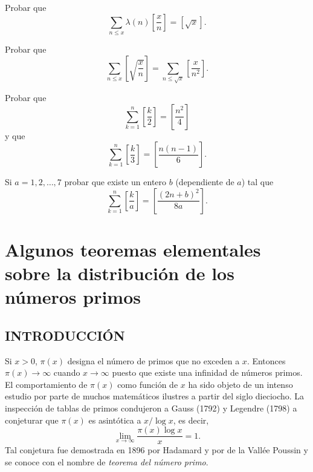 \documentclass[12pt,a4paper]{book}
\begin{document}
    \begin{ejercicio}
        Probar que
        \begin{equation*}
            \sum_{n\leq x}\lambda(n)\left[\frac{x}{n}\right]=[\sqrt x].
        \end{equation*}
    \end{ejercicio}

    \begin{ejercicio}
        Probar que
        \begin{equation*}
            \sum_{n\leq x}\left[\sqrt{\frac{x}{n}}\right]=\sum_{n\leq\sqrt x}\left[\frac{x}{n^2}\right].
        \end{equation*}
    \end{ejercicio}

    \begin{ejercicio}
        Probar que
        \begin{equation*}
            \sum_{k=1}^{n}\left[\frac{k}{2}\right]=\left[\frac{n^2}{4}\right]
        \end{equation*}
        y que
        \begin{equation*}
            \sum_{k=1}^{n}\left[\frac{k}{3}\right]=\left[\frac{n(n-1)}{6}\right].
        \end{equation*}
    \end{ejercicio}

    \begin{ejercicio}
        Si $a=1,2,\dots,7$ probar que existe un entero $b$ (dependiente de $a$) tal que
        \begin{equation*}
            \sum_{k=1}^{n}\left[\frac{k}{a}\right]=\left[\frac{(2n+b)^2}{8a}\right].
        \end{equation*}
    \end{ejercicio}

\chapter[Teoremas elementales sobre los primos]{Algunos teoremas elementales sobre la distribución de los números primos}

    \section{INTRODUCCIÓN}

    Si $x>0$, $\pi(x)$ designa el número de primos que no exceden a $x$. Entonces
    $\pi(x)\to\infty$ cuando $x\to\infty$ puesto que existe una infinidad de números
    primos. El comportamiento de $\pi(x)$ como función de $x$ ha sido objeto de un
    intenso estudio por parte de muchos matemáticos ilustres a partir del siglo
    dieciocho. La inspección de tablas de primos condujeron a Gauss (1792) y Legendre
    (1798) a conjeturar que $\pi(x)$ es asintótica a $x/\log x$, es decir,
    \begin{equation*}
        \lim_{x\to\infty}\frac{\pi(x)\log x}{x}=1.
    \end{equation*}
    Tal conjetura fue demostrada en 1896 por Hadamard y por de la Vallée Poussin y se
    conoce con el nombre de \textit{teorema del número primo}.
\end{document}
